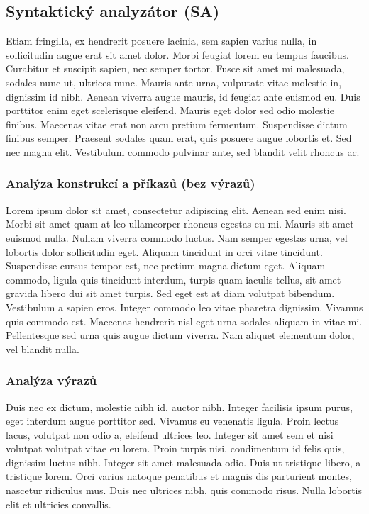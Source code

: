 \documentclass[11pt, a4paper]{article}
\begin{document}
\subsection{Syntaktický analyzátor (SA)}
Etiam fringilla, ex hendrerit posuere lacinia, sem sapien varius nulla, in sollicitudin augue erat sit amet dolor. Morbi feugiat lorem eu tempus faucibus. Curabitur et suscipit sapien, nec semper tortor. Fusce sit amet mi malesuada, sodales nunc ut, ultrices nunc. Mauris ante urna, vulputate vitae molestie in, dignissim id nibh. Aenean viverra augue mauris, id feugiat ante euismod eu. Duis porttitor enim eget scelerisque eleifend. Mauris eget dolor sed odio molestie finibus. Maecenas vitae erat non arcu pretium fermentum. Suspendisse dictum finibus semper. Praesent sodales quam erat, quis posuere augue lobortis et. Sed nec magna elit. Vestibulum commodo pulvinar ante, sed blandit velit rhoncus ac.

\subsubsection{Analýza konstrukcí a příkazů (bez výrazů)}
Lorem ipsum dolor sit amet, consectetur adipiscing elit. Aenean sed enim nisi. Morbi sit amet quam at leo ullamcorper rhoncus egestas eu mi. Mauris sit amet euismod nulla. Nullam viverra commodo luctus. Nam semper egestas urna, vel lobortis dolor sollicitudin eget. Aliquam tincidunt in orci vitae tincidunt. Suspendisse cursus tempor est, nec pretium magna dictum eget. Aliquam commodo, ligula quis tincidunt interdum, turpis quam iaculis tellus, sit amet gravida libero dui sit amet turpis. Sed eget est at diam volutpat bibendum. Vestibulum a sapien eros. Integer commodo leo vitae pharetra dignissim. Vivamus quis commodo est. Maecenas hendrerit nisl eget urna sodales aliquam in vitae mi. Pellentesque sed urna quis augue dictum viverra. Nam aliquet elementum dolor, vel blandit nulla. 


\subsubsection{Analýza výrazů}
Duis nec ex dictum, molestie nibh id, auctor nibh. Integer facilisis ipsum purus, eget interdum augue porttitor sed. Vivamus eu venenatis ligula. Proin lectus lacus, volutpat non odio a, eleifend ultrices leo. Integer sit amet sem et nisi volutpat volutpat vitae eu lorem. Proin turpis nisi, condimentum id felis quis, dignissim luctus nibh. Integer sit amet malesuada odio. Duis ut tristique libero, a tristique lorem. Orci varius natoque penatibus et magnis dis parturient montes, nascetur ridiculus mus. Duis nec ultrices nibh, quis commodo risus. Nulla lobortis elit et ultricies convallis. 
\end{document}
